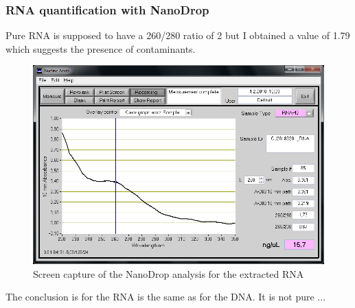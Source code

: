 \subsubsection{RNA quantification with NanoDrop}

Pure RNA is supposed to have a 260/280 ratio of 2 but I obtained a value of 1.79 which suggests the presence of contaminants.

\begin{figure}[H] %
    \centering
    \caption{Screen capture of the NanoDrop analysis for the extracted RNA}
    \label{fig:CJ20180201_RNA}
    \includegraphics[width=\textwidth]{graphics/screenshots/CJ20180201_RNA.png}
\end{figure}

The conclusion is for the RNA is the same as for the DNA. It is not pure ...





